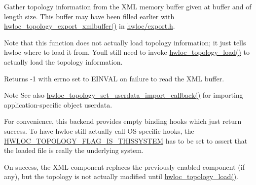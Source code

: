 Gather topology information from the X\+ML memory buffer given at {\ttfamily buffer} and of length {\ttfamily size}. This buffer may have been filled earlier with \hyperlink{a00206_gad33b7f7c11db10459505a3b1634fd3f1}{hwloc\+\_\+topology\+\_\+export\+\_\+xmlbuffer()} in \hyperlink{a00128_source}{hwloc/export.\+h}.

Note that this function does not actually load topology information; it just tells hwloc where to load it from. You\textquotesingle{}ll still need to invoke \hyperlink{a00186_gabdf58d87ad77f6615fccdfe0535ff826}{hwloc\+\_\+topology\+\_\+load()} to actually load the topology information.

\begin{DoxyReturn}{Returns}
-\/1 with errno set to E\+I\+N\+V\+AL on failure to read the X\+ML buffer.
\end{DoxyReturn}
\begin{DoxyNote}{Note}
See also \hyperlink{a00206_ga5ac6917ea7289955fb1ffda4353af9b0}{hwloc\+\_\+topology\+\_\+set\+\_\+userdata\+\_\+import\+\_\+callback()} for importing application-\/specific object userdata.

For convenience, this backend provides empty binding hooks which just return success. To have hwloc still actually call O\+S-\/specific hooks, the \hyperlink{a00193_ggada025d3ec20b4b420f8038d23d6e7bdea6ecb6abc6a0bb75e81564f8bca85783b}{H\+W\+L\+O\+C\+\_\+\+T\+O\+P\+O\+L\+O\+G\+Y\+\_\+\+F\+L\+A\+G\+\_\+\+I\+S\+\_\+\+T\+H\+I\+S\+S\+Y\+S\+T\+EM} has to be set to assert that the loaded file is really the underlying system.

On success, the X\+ML component replaces the previously enabled component (if any), but the topology is not actually modified until \hyperlink{a00186_gabdf58d87ad77f6615fccdfe0535ff826}{hwloc\+\_\+topology\+\_\+load()}. 
\end{DoxyNote}
